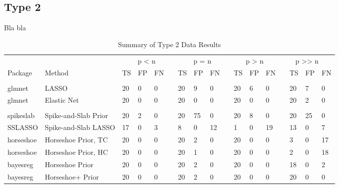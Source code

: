 \documentclass[
  11pt,
]{article}
\begin{document}
\subsection{Type 2}

Bla bla

\begin{table}[!h]

\caption{\label{tab:Results T2}Summary of Type 2 Data Results}
\centering
\fontsize{8.5}{10.5}\selectfont
\begin{tabular}[t]{>{}l|>{}l|>{}l|>{}l|>{}l|>{}l|>{}l|>{}l|>{}l|>{}l|>{}l|>{}l|>{}l|>{}l|>{}l|>{}l|>{}l|}
\toprule
\multicolumn{2}{c}{ } & \multicolumn{4}{c}{p < n} & \multicolumn{4}{c}{p = n} & \multicolumn{3}{c}{p > n} & \multicolumn{4}{c}{p >> n} \\
\cmidrule(l{3pt}r{3pt}){3-6} \cmidrule(l{3pt}r{3pt}){7-10} \cmidrule(l{3pt}r{3pt}){11-13} \cmidrule(l{3pt}r{3pt}){14-17}
Package & Method & TS & FP & FN &  & TS & FP & FN &  & TS & FP & FN &  & TS & FP & FN\\
\midrule
\addlinespace[0.3em]
\multicolumn{17}{l}{\textbf{Frequentist Methods}}\\
\hspace{1em}glmnet & LASSO & 20 & 0 & 0 &  & 20 & 9 & 0 &  & 20 & 6 & 0 &  & 20 & 7 & 0\\
\hspace{1em}glmnet & Elastic Net & 20 & 0 & 0 &  & 20 & 0 & 0 &  & 20 & 0 & 0 &  & 20 & 2 & 0\\
\addlinespace[0.3em]
\multicolumn{17}{l}{\textbf{Bayesian Methods}}\\
\hspace{1em}spikeslab & Spike-and-Slab Prior & 20 & 2 & 0 &  & 20 & 75 & 0 &  & 20 & 8 & 0 &  & 20 & 25 & 0\\
\hspace{1em}SSLASSO & Spike-and-Slab LASSO & 17 & 0 & 3 &  & 8 & 0 & 12 &  & 1 & 0 & 19 &  & 13 & 0 & 7\\
\hspace{1em}horseshoe & Horseshoe Prior, TC & 20 & 0 & 0 &  & 20 & 2 & 0 &  & 20 & 0 & 0 &  & 3 & 0 & 17\\
\hspace{1em}horseshoe & Horseshoe Prior, HC & 20 & 0 & 0 &  & 20 & 1 & 0 &  & 20 & 0 & 0 &  & 2 & 0 & 18\\
\hspace{1em}bayesreg & Horseshoe Prior & 20 & 0 & 0 &  & 20 & 2 & 0 &  & 20 & 0 & 0 &  & 18 & 0 & 2\\
\hspace{1em}bayesreg & Horseshoe+ Prior & 20 & 0 & 0 &  & 20 & 2 & 0 &  & 20 & 0 & 0 &  & 20 & 0 & 0\\

\end{tabular}
\end{table}
\end{document}
